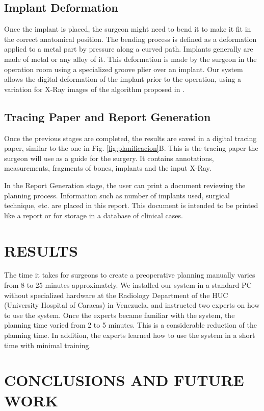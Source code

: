 \documentclass{cimenics}
\begin{document}
\subsection{Implant Deformation}

Once the implant is placed, the surgeon might need to bend it
to make it fit in the correct anatomical position. The bending
process is defined as a deformation applied to a metal part by
pressure along a curved path. Implants generally are made of metal
or any alloy of it. This deformation is made by the surgeon in the
operation room using a specialized groove plier over an implant.
Our system allows the digital deformation of the implant prior to
the operation, using a variation for X-Ray images of the algorithm
proposed in \cite{BIRK03}.

\subsection{Tracing Paper and Report Generation}

Once the previous stages are completed, the results are saved in a
digital tracing paper, similar to the one in Fig.
\ref{fig:planificacion}\color{red}B\color{black}. This is the
tracing paper the surgeon will use as a guide for the surgery. It
contains annotations, measurements, fragments of bones, implants
and the input X-Ray.

In the Report Generation stage, the user can print a document
reviewing the planning process. Information such as number of
implants used, surgical technique, etc. are placed in this report.
This document is intended to be printed like a report or for
storage in a database of clinical cases.
%
\section{RESULTS}

The time it takes for surgeons to create a preoperative planning
manually varies from 8 to 25 minutes approximately. We installed
our system in a standard PC without specialized hardware at the
Radiology Department of the HUC (University Hospital of Caracas) in
Venezuela, and instructed two experts on how to use the system.
Once the experts became familiar with the system, the planning time
varied from 2 to 5 minutes. This is a considerable reduction of
the planning time. In addition, the experts learned how to use the system in a short time with minimal training. 

\section{CONCLUSIONS AND FUTURE WORK}
\end{document}
